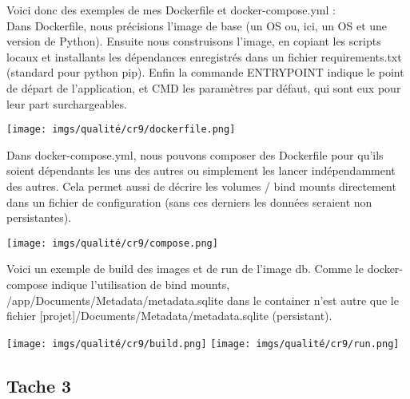 Voici donc des exemples de mes Dockerfile et docker-compose.yml : \\

Dans Dockerfile, nous précisions l'image de base (un OS ou, ici, un OS et une version de Python). Ensuite nous construisons l'image, en copiant les scripts locaux et installants les dépendances enregistrés dans un fichier requirements.txt (standard pour python pip). Enfin la commande ENTRYPOINT indique le point de départ de l'application, et CMD les paramètres par défaut, qui sont eux pour leur part surchargeables.
\begin{center}
    \texttt{[image: imgs/qualité/cr9/dockerfile.png]}
\end{center}

Dans docker-compose.yml, nous pouvons composer des Dockerfile pour qu'ils soient dépendants les uns des autres ou simplement les lancer indépendamment des autres. Cela permet aussi de décrire les volumes / bind mounts directement dans un fichier de configuration (sans ces derniers les données seraient non persistantes).
\begin{center}
    \texttt{[image: imgs/qualité/cr9/compose.png]}
\end{center}

Voici un exemple de build des images et de run de l'image db. Comme le docker-compose indique l'utilisation de bind mounts, /app/Documents/Metadata/metadata.sqlite dans le container n'est autre que le fichier [projet]/Documents/Metadata/metadata.sqlite (persistant).
\begin{center}
    \texttt{[image: imgs/qualité/cr9/build.png]}
    \texttt{[image: imgs/qualité/cr9/run.png]}
\end{center}


\subsection{Tache 3}